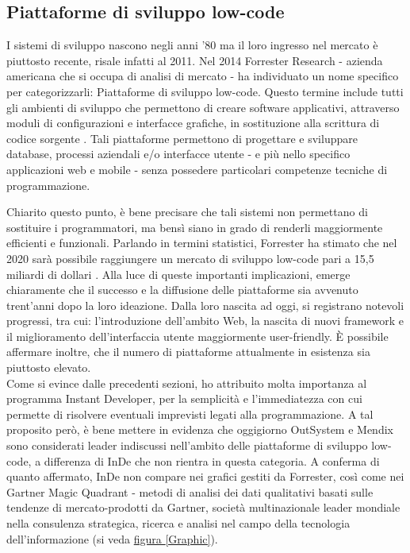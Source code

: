 \subsection{Piattaforme di sviluppo low-code}
I sistemi di sviluppo nascono negli anni '80 ma il loro ingresso nel mercato è piuttosto recente, risale infatti al 2011.  Nel 2014 Forrester Research - azienda americana che si occupa di analisi di mercato - ha individuato un nome specifico per categorizzarli: Piattaforme di sviluppo low-code. 
Questo termine include tutti gli ambienti di sviluppo che permettono di creare software applicativi, attraverso moduli di configurazioni e interfacce grafiche, in sostituzione alla scrittura di codice sorgente \hyperref[bib17]{\cite{[17]}}.
Tali piattaforme permettono di progettare e sviluppare database, processi aziendali e/o interfacce utente - e più nello specifico applicazioni web e mobile - senza possedere particolari competenze tecniche di programmazione. 

Chiarito questo punto, è bene precisare che tali sistemi non permettano di sostituire i programmatori, ma bensì siano in grado di renderli maggiormente efficienti e funzionali. Parlando in termini statistici, Forrester ha stimato che nel 2020 sarà possibile raggiungere un mercato di sviluppo low-code pari a 15,5 miliardi di dollari \hyperref[bib17]{\cite{[17]}}.
Alla luce di queste importanti implicazioni, emerge chiaramente che il successo e la diffusione delle piattaforme sia avvenuto trent'anni dopo la loro ideazione.
Dalla loro nascita ad oggi, si registrano notevoli progressi, tra cui: l'introduzione dell'ambito Web, la nascita di nuovi framework e il miglioramento dell'interfaccia utente maggiormente user-friendly. 
È possibile affermare inoltre, che il numero di piattaforme attualmente in esistenza sia piuttosto elevato.\\

Come si evince dalle precedenti sezioni, ho attribuito molta importanza al programma Instant Developer, per la semplicità e l'immediatezza con cui permette di risolvere eventuali imprevisti legati alla programmazione. 
A tal proposito però, è bene mettere in evidenza che oggigiorno OutSystem e Mendix  sono considerati leader indiscussi nell'ambito delle piattaforme di sviluppo low-code, a differenza di InDe che non rientra in questa categoria. 
A conferma di quanto affermato, InDe non compare nei grafici gestiti da Forrester, così come nei Gartner Magic Quadrant - metodi di analisi dei dati qualitativi basati sulle tendenze di mercato-prodotti da Gartner, società multinazionale leader mondiale nella consulenza strategica, ricerca e analisi nel campo della tecnologia dell'informazione (si veda \hyperref[Graphic]{figura \ref{Graphic}}).

